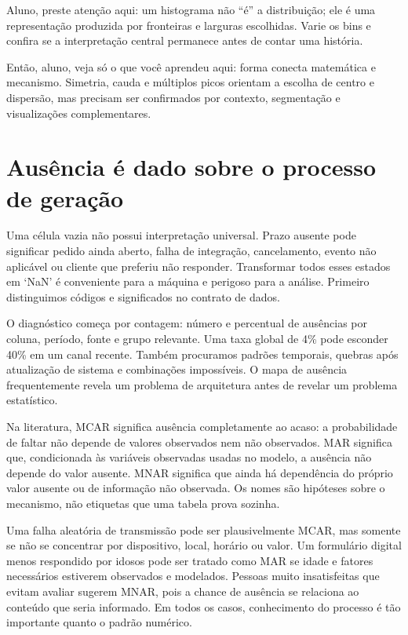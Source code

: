 \begin{GuidedBox}
Aluno, preste atenção aqui: um histograma não ``é'' a distribuição; ele é uma representação produzida por fronteiras e larguras escolhidas. Varie os bins e confira se a interpretação central permanece antes de contar uma história.
\end{GuidedBox}

\begin{SummaryBox}
Então, aluno, veja só o que você aprendeu aqui: forma conecta matemática e mecanismo. Simetria, cauda e múltiplos picos orientam a escolha de centro e dispersão, mas precisam ser confirmados por contexto, segmentação e visualizações complementares.
\end{SummaryBox}

\section{Ausência é dado sobre o processo de geração}

Uma célula vazia não possui interpretação universal. Prazo ausente pode significar pedido ainda aberto, falha de integração, cancelamento, evento não aplicável ou cliente que preferiu não responder. Transformar todos esses estados em `NaN' é conveniente para a máquina e perigoso para a análise. Primeiro distinguimos códigos e significados no contrato de dados.

O diagnóstico começa por contagem: número e percentual de ausências por coluna, período, fonte e grupo relevante. Uma taxa global de 4\% pode esconder 40\% em um canal recente. Também procuramos padrões temporais, quebras após atualização de sistema e combinações impossíveis. O mapa de ausência frequentemente revela um problema de arquitetura antes de revelar um problema estatístico.

Na literatura, MCAR significa ausência completamente ao acaso: a probabilidade de faltar não depende de valores observados nem não observados. MAR significa que, condicionada às variáveis observadas usadas no modelo, a ausência não depende do valor ausente. MNAR significa que ainda há dependência do próprio valor ausente ou de informação não observada. Os nomes são hipóteses sobre o mecanismo, não etiquetas que uma tabela prova sozinha.

Uma falha aleatória de transmissão pode ser plausivelmente MCAR, mas somente se não se concentrar por dispositivo, local, horário ou valor. Um formulário digital menos respondido por idosos pode ser tratado como MAR se idade e fatores necessários estiverem observados e modelados. Pessoas muito insatisfeitas que evitam avaliar sugerem MNAR, pois a chance de ausência se relaciona ao conteúdo que seria informado. Em todos os casos, conhecimento do processo é tão importante quanto o padrão numérico.

